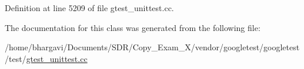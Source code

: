 Definition at line 5209 of file gtest\+\_\+unittest.\+cc.



The documentation for this class was generated from the following file\+:\begin{DoxyCompactItemize}
\item 
/home/bhargavi/\+Documents/\+S\+D\+R/\+Copy\+\_\+\+Exam\+\_\+X/vendor/googletest/googletest/test/\hyperlink{gtest__unittest_8cc}{gtest\+\_\+unittest.\+cc}\end{DoxyCompactItemize}
